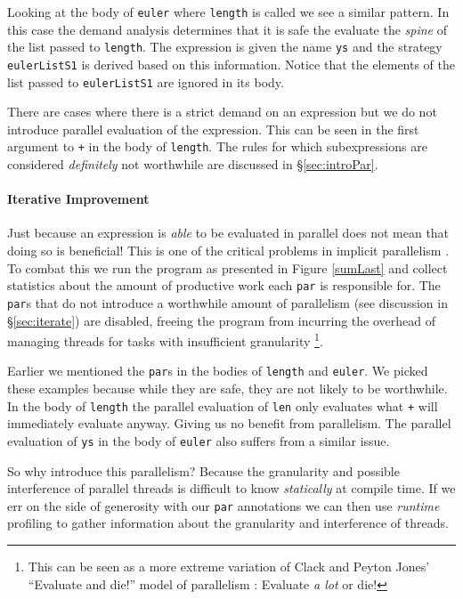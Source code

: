 Looking at the body of \verb-euler- where \verb-length- is called we see a
similar pattern. In this case the demand analysis determines that it is
safe the evaluate the \emph{spine} of the list passed to \verb-length-.
The expression is given the name \verb-ys- and the strategy \verb-eulerListS1-
is derived based on this information. Notice that the elements of the list
passed to \verb-eulerListS1- are ignored in its body. 

There are cases where there is a strict demand on an expression but we
do not introduce parallel evaluation of the expression. This can be seen
in the first argument to \verb-+- in the body of \verb-length-. The rules
for which subexpressions are considered \emph{definitely} not worthwhile
are discussed in \S\ref{sec:introPar}.

\paragraph{Iterative Improvement}

Just because an expression is \emph{able} to be evaluated in parallel does not
mean that doing so is beneficial! This is one of the critical problems in
implicit parallelism \citep{hogen1992automatic, hammond2000research,
Jones2009Tuning}. To combat this we run the program as presented in Figure
\ref{sumLast} and collect statistics about the amount of productive work
each \verb-par- is responsible for. The \verb-par-s that do not introduce
a worthwhile amount of parallelism (see discussion in \S\ref{sec:iterate})
are disabled, freeing the program from incurring the overhead of managing
threads for tasks with insufficient granularity \footnote{This can be seen
as a more extreme variation of Clack and Peyton Jones' ``Evaluate and die!''
model of parallelism \citep{clack1986four}: Evaluate \emph{a lot} or die!}.

Earlier we mentioned the \verb-par-s in the bodies of \verb-length- and
\verb-euler-. We picked these examples because while they are safe, they are
not likely to be worthwhile. In the body of \verb-length- the parallel
evaluation of \verb-len- only evaluates what \verb-+- will immediately evaluate
anyway. Giving us no benefit from parallelism. The parallel evaluation of
\verb-ys- in the body of \verb-euler- also suffers from a similar issue.

So why introduce this parallelism? Because the granularity and possible
interference of parallel threads is difficult to know \emph{statically} at
compile time. If we err on the side of generosity with our \verb-par-
annotations we can then use \emph{runtime} profiling to gather information
about the granularity and interference of threads. 


